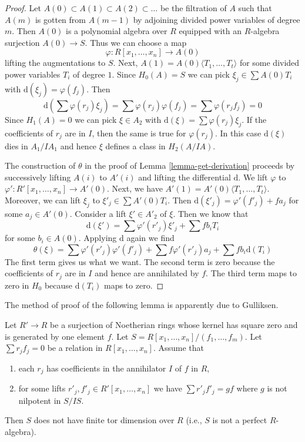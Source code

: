 \begin{proof}
Let $A(0) \subset A(1) \subset A(2) \subset \ldots$ be the filtration
of $A$ such that $A(m)$ is gotten from $A(m - 1)$ by adjoining divided
power variables of degree $m$. Then $A(0)$ is a polynomial algebra
over $R$ equipped with an $R$-algebra surjection $A(0) \to S$.
Thus we can choose a map
$$
\varphi : R[x_1, \ldots, x_n] \to A(0)
$$
lifting the augmentations to $S$.
Next, $A(1) = A(0)\langle T_1, \ldots, T_t \rangle$ for some divided
power variables $T_i$ of degree $1$. Since $H_0(A) = S$ we
can pick $\xi_j \in \sum A(0)T_i$ with $\text{d}(\xi_j) = \varphi(f_j)$.
Then
$$
\text{d}\left(\sum \varphi(r_j) \xi_j\right) =
\sum  \varphi(r_j) \varphi(f_j) =  \sum \varphi(r_jf_j) = 0
$$
Since $H_1(A) = 0$ we can pick $\xi \in A_2$ with
$\text{d}(\xi) = \sum \varphi(r_j) \xi_j$.
If the coefficients of $r_j$ are in $I$, then the same
is true for $\varphi(r_j)$. In this case
$\text{d}(\xi)$ dies in $A_1/IA_1$ and
hence $\xi$ defines a class in $H_2(A/IA)$.

\medskip\noindent
The construction of $\theta$ in the proof of Lemma \ref{lemma-get-derivation}
proceeds by successively lifting $A(i)$ to $A'(i)$ and lifting the
differential $\text{d}$. We lift $\varphi$
to $\varphi' : R'[x_1, \ldots, x_n] \to A'(0)$.
Next, we have $A'(1) = A'(0)\langle T_1, \ldots, T_t\rangle$.
Moreover, we can lift $\xi_j$ to $\xi'_j \in \sum A'(0)T_i$.
Then $\text{d}(\xi'_j) = \varphi'(f'_j) + f a_j$ for some
$a_j \in A'(0)$.
Consider a lift $\xi' \in A'_2$ of $\xi$.
Then we know that
$$
\text{d}(\xi') = \sum \varphi'(r'_j)\xi'_j + \sum fb_iT_i
$$
for some $b_i \in A(0)$. Applying $\text{d}$ again we find
$$
\theta(\xi) = \sum \varphi'(r'_j)\varphi'(f'_j) +
\sum f \varphi'(r'_j) a_j + \sum fb_i \text{d}(T_i)
$$
The first term gives us what we want. The second term is zero
because the coefficients of $r_j$ are in $I$ and hence are
annihilated by $f$. The third term maps to zero in $H_0$
because $\text{d}(T_i)$ maps to zero.
\end{proof}

\noindent
The method of proof of the following lemma is apparently due to Gulliksen.

\begin{lemma}
\label{lemma-not-finite-pd}
Let $R' \to R$ be a surjection of Noetherian rings whose kernel has square
zero and is generated by one element $f$. Let
$S = R[x_1, \ldots, x_n]/(f_1, \ldots, f_m)$.
Let $\sum r_j f_j = 0$ be a relation in $R[x_1, \ldots, x_n]$.
Assume that
\begin{enumerate}
\item each $r_j$ has coefficients in the annihilator $I$ of $f$ in $R$,
\item for some lifts $r'_j, f'_j \in R'[x_1, \ldots, x_n]$ we have
$\sum r'_j f'_j = gf$ where $g$ is not nilpotent in $S/IS$.
\end{enumerate}
Then $S$ does not have finite tor dimension over $R$ (i.e., $S$ is not
a perfect $R$-algebra).
\end{lemma}

